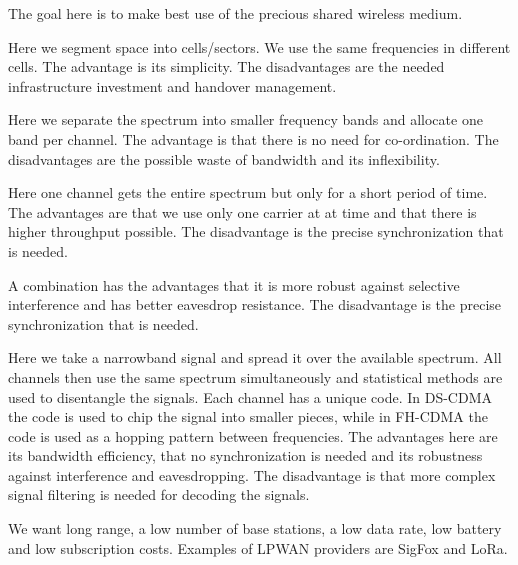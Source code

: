 \begin{mytitle}[Multiplexing] The goal here is to make best use of the precious shared wireless medium.
    \begin{mysubtitle} Here we segment space into cells/sectors. We use the same frequencies in different cells. The advantage is its simplicity. The disadvantages are the needed infrastructure investment and handover management.
    \end{mysubtitle}
    \begin{mysubtitle} Here we separate the spectrum into smaller frequency bands and allocate one band per channel. The advantage is that there is no need for co-ordination. The disadvantages are the possible waste of bandwidth and its inflexibility.
    \end{mysubtitle}
    \begin{mysubtitle} Here one channel gets the entire spectrum but only for a short period of time. The advantages are that we use only one carrier at at time and that there is higher throughput possible. The disadvantage is the precise synchronization that is needed.
    \end{mysubtitle}
    \begin{mysubtitle} A combination has the advantages that it is more robust against selective interference and has better eavesdrop resistance. The disadvantage is the precise synchronization that is needed.
    \end{mysubtitle}
    \begin{mysubtitle} Here we take a narrowband signal and spread it over the available spectrum. All channels then use the same spectrum simultaneously and statistical methods are used to disentangle the signals. Each channel has a unique code. In DS-CDMA the code is used to chip the signal into smaller pieces, while in FH-CDMA the code is used as a hopping pattern between frequencies. The advantages here are its bandwidth efficiency, that no synchronization is needed and its robustness against interference and eavesdropping. The disadvantage is that more complex signal filtering is needed for decoding the signals.
    \end{mysubtitle}
\end{mytitle}
\begin{mytitle} We want long range, a low number of base stations, a low data rate, low battery and low subscription costs. Examples of LPWAN providers are SigFox and LoRa.
\end{mytitle}

